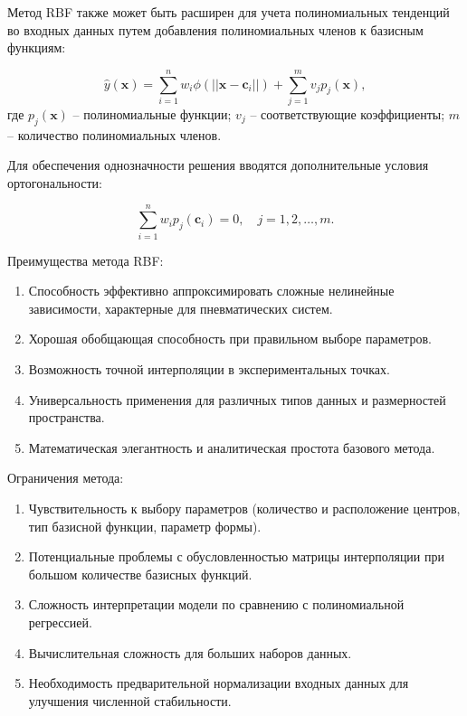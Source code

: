 Метод RBF также может быть расширен для учета полиномиальных тенденций во входных данных путем добавления полиномиальных членов к базисным функциям:

\begin{equation}
\hat{y}(\mathbf{x}) = \sum_{i=1}^{n} w_i \phi(||\mathbf{x} - \mathbf{c}_i||) + \sum_{j=1}^{m} v_j p_j(\mathbf{x}),
\end{equation}
где $p_j(\mathbf{x})$ -- полиномиальные функции;
$v_j$ -- соответствующие коэффициенты;
$m$ -- количество полиномиальных членов.

Для обеспечения однозначности решения вводятся дополнительные условия ортогональности:

\begin{equation}
\sum_{i=1}^{n} w_i p_j(\mathbf{c}_i) = 0, \quad j = 1, 2, \ldots, m.
\end{equation}

Преимущества метода RBF:

\begin{enumerate}
	\item Способность эффективно аппроксимировать сложные нелинейные зависимости, характерные для пневматических систем.
	\item Хорошая обобщающая способность при правильном выборе параметров.
	\item Возможность точной интерполяции в экспериментальных точках.
	\item Универсальность применения для различных типов данных и размерностей пространства.
	\item Математическая элегантность и аналитическая простота базового метода.
\end{enumerate}

Ограничения метода:

\begin{enumerate}
	\item Чувствительность к выбору параметров (количество и расположение центров, тип базисной функции, параметр формы).
	\item Потенциальные проблемы с обусловленностью матрицы интерполяции при большом количестве базисных функций.
	\item Сложность интерпретации модели по сравнению с полиномиальной регрессией.
	\item Вычислительная сложность для больших наборов данных.
	\item Необходимость предварительной нормализации входных данных для улучшения численной стабильности.
\end{enumerate}

